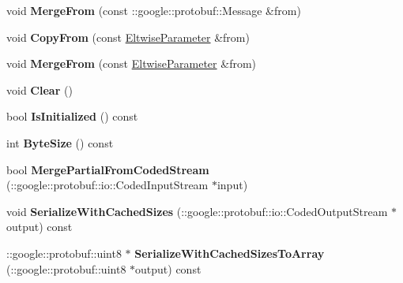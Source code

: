 \begin{DoxyCompactItemize}
void {\bfseries Merge\+From} (const \+::google\+::protobuf\+::\+Message \&from)
\item 
\mbox{\label{classcaffe_1_1_eltwise_parameter_ad9fce1e756a3ee86ef45a1548e676154}} 
void {\bfseries Copy\+From} (const \mbox{\hyperlink{classcaffe_1_1_eltwise_parameter}{Eltwise\+Parameter}} \&from)
\item 
\mbox{\label{classcaffe_1_1_eltwise_parameter_a5051e2a4266251e87679c0b96f4990e4}} 
void {\bfseries Merge\+From} (const \mbox{\hyperlink{classcaffe_1_1_eltwise_parameter}{Eltwise\+Parameter}} \&from)
\item 
\mbox{\label{classcaffe_1_1_eltwise_parameter_ac8a7a2a57ea863400795f083682fa0d4}} 
void {\bfseries Clear} ()
\item 
\mbox{\label{classcaffe_1_1_eltwise_parameter_a2313e6d3be73d343f3163457d974470e}} 
bool {\bfseries Is\+Initialized} () const
\item 
\mbox{\label{classcaffe_1_1_eltwise_parameter_a15397b5fa4932782c97b83f06505fe10}} 
int {\bfseries Byte\+Size} () const
\item 
\mbox{\label{classcaffe_1_1_eltwise_parameter_aaf6aaab4e4e51276fbaba244b6a3a6a5}} 
bool {\bfseries Merge\+Partial\+From\+Coded\+Stream} (\+::google\+::protobuf\+::io\+::\+Coded\+Input\+Stream $\ast$input)
\item 
\mbox{\label{classcaffe_1_1_eltwise_parameter_ad51725f1aafd0b490b1eab81c1f6f254}} 
void {\bfseries Serialize\+With\+Cached\+Sizes} (\+::google\+::protobuf\+::io\+::\+Coded\+Output\+Stream $\ast$output) const
\item 
\mbox{\label{classcaffe_1_1_eltwise_parameter_ad2251d80292b3f837091a917bf04ba2a}} 
\+::google\+::protobuf\+::uint8 $\ast$ {\bfseries Serialize\+With\+Cached\+Sizes\+To\+Array} (\+::google\+::protobuf\+::uint8 $\ast$output) const
\item 
\mbox{\label{classcaffe_1_1_eltwise_parameter_a4f57942b94300366f8051a54ad1d8374}} 

\end{DoxyCompactItemize}
